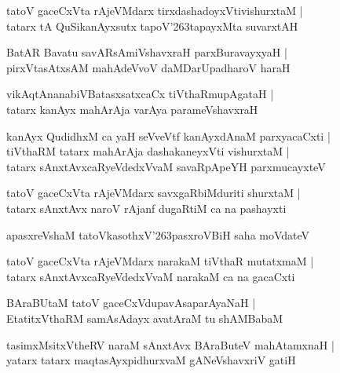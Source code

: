 \documentclass[twoside,12pt,openright]{book}
\def\S{\char'263}
\newcounter{shloka}[chapter]
\begin{document}
\begin{shloka}
tatoV gaceCxVta rAjeVMdarx tirxdashadoyxVtivishurxtaM |\\
tatarx tA QuSikanAyxsutx tapoV\S tapayxMta suvarxtAH 
\end{shloka}

\begin{shloka}
BatAR Bavatu savARsAmiVshavxraH parxBuravayxyaH |\\
pirxVtasAtxsAM mahAdeVvoV daMDarUpadharoV haraH
\end{shloka}

\begin{shloka}
vikAqtAnanabiVBatasxsatxcaCx tiVthaRmupAgataH |\\
tatarx kanAyx mahArAja varAya parameVshavxraH
\end{shloka}

\begin{shloka}
kanAyx QudidhxM ca yaH seVveVtf kanAyxdAnaM parxyacaCxti |\\
tiVthaRM tatarx mahArAja dashakaneyxVti vishurxtaM |\\
tatarx sAnxtAvxcaRyeVdedxVvaM savaRpApeYH parxmucayxteV
\end{shloka}

\begin{shloka}
tatoV gaceCxVta rAjeVMdarx savxgaRbiMduriti shurxtaM |\\
tatarx sAnxtAvx naroV rAjanf dugaRtiM ca na pashayxti
\end{shloka}

\begin{shloka}
apasxreVshaM tatoVkasothxV\S pasxroVBiH saha moVdateV
\end{shloka}

\begin{shloka}
tatoV gaceCxVta rAjeVMdarx narakaM tiVthaR mutatxmaM |\\
tatarx sAnxtAvxcaRyeVdedxVvaM narakaM ca na gacaCxti
\end{shloka}

\begin{shloka}
BAraBUtaM tatoV gaceCxVdupavAsaparAyaNaH |\\
EtatitxVthaRM samAsAdayx avatAraM tu shAMBabaM
\end{shloka}

\begin{shloka}
tasimxMsitxVtheRV naraM sAnxtAvx BAraButeV mahAtamxnaH |\\
yatarx tatarx maqtasAyxpidhurxvaM gANeVshavxriV gatiH
\end{shloka}
\end{document}
